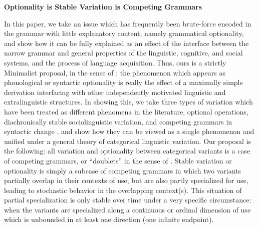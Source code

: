 \documentclass[a4paper,aps,prl,12pt,tightenlines,superscriptaddress]{revtex4}
\title{}%
\begin{document}
\begin{center} \textbf{Optionality is Stable Variation is Competing Grammars}  \end{center}


\noindent In this paper, we take an issue which has frequently been brute-force encoded in the grammar with little explanatory content, namely grammatical optionality, and show how it can be fully explained as an effect of the interface between the narrow grammar and general properties of the linguistic, cognitive, and social systems, and the process of language acquisition. 
Thus, ours is a strictly Minimalist proposal, in the sense of \citep[][inter alia]{chomsky1993, chomsky2001}; the phenomenon which appears as phonological or syntactic optionality is really the effect of a maximally simple derivation interfacing with other independently motivated linguistic and extralinguistic structures. In showing this, we take three types of variation which have been treated as different phenomena in the literature, optional operations, diachronically stable sociolinguistic variation, and competing grammars in syntactic change \citep[][]{kroch1989}, and show how they can be viewed as a single phenomenon and unified under a general theory of categorical linguistic variation. 
Our proposal is the following: all variation and optionality between categorical variants is a case of competing grammars, or ``doublets'' in the sense of \citet{kroch1994}. 
Stable variation or optionality is simply a subcase of competing grammars in which two variants partially overlap in their contexts of use, but are also partly specialized for use, leading to stochastic behavior in the overlapping context(s). 
This situation of partial specialization is only stable over time under a very specific circumstance: when the variants are specialized along a continuous or ordinal dimension of use which is unbounded in at least one direction (one infinite endpoint).
\end{document}
